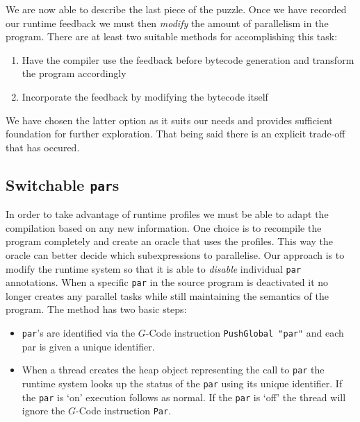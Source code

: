 We are now able to describe the last piece of the puzzle. Once we have
recorded our runtime feedback we must then \emph{modify} the amount of
parallelism in the program. There are at least two suitable methods for
accomplishing this task:

    \begin{enumerate}
        \item Have the compiler use the feedback before bytecode generation
            and transform the program accordingly
        \item Incorporate the feedback by modifying the bytecode itself
    \end{enumerate}

We have chosen the latter option as it suits our needs and provides sufficient
foundation for further exploration. That being said there is an explicit
trade-off that has occured.

\subsection{Switchable \texttt{par}s}
\label{sec:switchPar}

    In order to take advantage of runtime profiles we must be able to adapt the
compilation based on any new information.  One choice is to recompile the
program completely and create an oracle that uses the profiles. This way the
oracle can better decide which subexpressions to parallelise. Our approach is to
modify the runtime system so that it is able to \emph{disable} individual
\verb-par- annotations. When a specific \verb=par= in the source program is
deactivated it no longer creates any parallel tasks while still maintaining the
semantics of the program.  The method has two basic steps:

    \begin{itemize}
        \item \verb=par='s are identified via the $G$-Code instruction
                \verb=PushGlobal "par"= and each par is given a unique identifier.
        \item When a thread creates the heap object representing the call to
                \verb=par= the runtime system looks up the status of the \verb=par= using its
                unique identifier. If the \verb=par= is `on' execution follows as normal. If the
                \verb=par= is `off' the thread will ignore the $G$-Code instruction \verb=Par=.
    \end{itemize}

